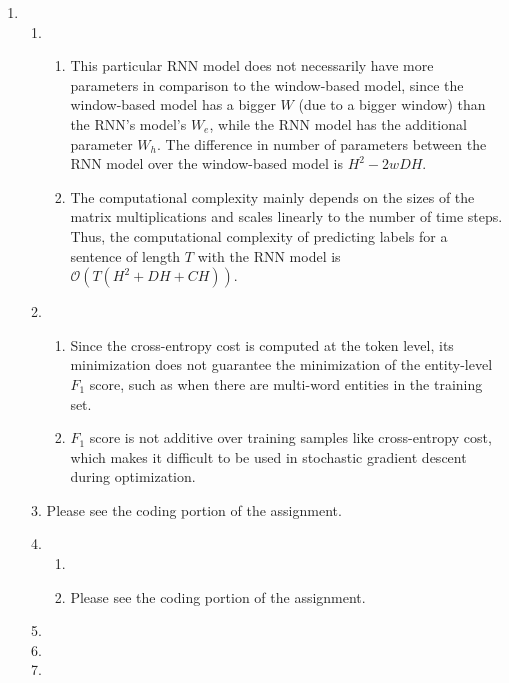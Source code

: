 \documentclass[10pt,reqno]{amsart}
\begin{document}
\begin{enumerate}[topsep=0pt,itemsep=3ex,partopsep=1ex,parsep=1ex]
\item
  \begin{enumerate}[itemsep=2ex]
  \item 
    \begin{enumerate}[itemsep=2ex]
      \item This particular RNN model does not necessarily have more parameters in 
        comparison to the window-based model, since the window-based model has a 
        bigger $W$ (due to a bigger window) than the RNN's model's $W_e$, while the RNN model 
        has the additional parameter $W_h$.
        The difference in number of parameters between the RNN model over 
        the window-based model is $H^2 - 2wDH$.
      \item The computational complexity mainly depends on the sizes of the 
        matrix multiplications and scales linearly to the number of time steps.
        Thus, the computational complexity of predicting labels for a sentence of length $T$
        with the RNN model is $\mathcal{O}(T(H^2+DH+CH))$.
    \end{enumerate}
  \item 
    \begin{enumerate}[itemsep=2ex]
      \item Since the cross-entropy cost is computed at the token level, its minimization
        does not guarantee the minimization of the entity-level $F_1$ score, such as when there 
        are multi-word entities in the training set. 
      \item $F_1$ score is not additive over training samples like cross-entropy cost, which makes 
        it difficult to be used in stochastic gradient descent during optimization. 
    \end{enumerate}
  \item Please see the coding portion of the assignment.
  \item 
    \begin{enumerate}[itemsep=2ex]
      \item
      \item Please see the coding portion of the assignment.
    \end{enumerate}
  \item %
  \item %
  \item 
  \end{enumerate}



\end{enumerate}
\end{document}
